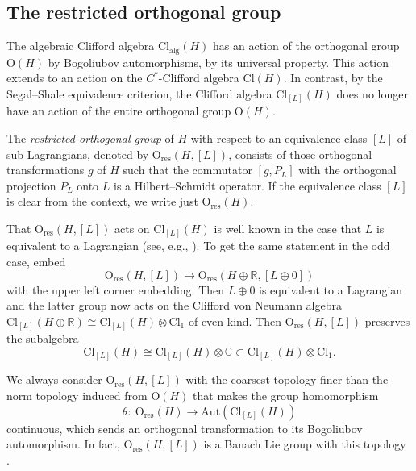 \documentclass[pdftex]{sigma}
\numberwithin{equation}{section}
\newcommand{\R}{\mathbb{R}}
\newcommand{\C}{\mathbb{C}}
\newcommand{\Cl}{\mathrm{Cl}}
\newcommand{\res}{\mathrm{res}}
\newcommand{\Aut}{\mathrm{Aut}}
\renewcommand{\O}{\mathrm{O}}
\begin{document}
\subsection{The restricted orthogonal group}

The algebraic Clifford algebra $\Cl_{\mathrm{alg}}(H)$ has an action of the orthogonal group $\O(H)$ by Bogoliubov automorphisms, by its universal property.
This action extends to an action on the $C^*$-Clifford algebra $\Cl(H)$.
In contrast, by the Segal--Shale equivalence criterion, the Clifford algebra $\Cl_{[L]}(H)$ does no longer have an action of the entire orthogonal group $\O(H)$.

\begin{Definition}
The \emph{restricted orthogonal group} of $H$ with respect to an equivalence class $[L]$ of sub-Lagrangians, denoted by $\O_{\res}(H, [L])$, consists of those orthogonal transformations $g$ of $H$ such that the commutator $[g, P_L]$ with the orthogonal projection $P_L$ onto $L$ is a Hilbert--Schmidt operator.
If the equivalence class $[L]$ is clear from the context, we write just $\O_{\res}(H)$.
\end{Definition}

That $\O_{\res}(H, [L])$ acts on $\Cl_{[L]}(H)$ is well known in the case that $L$ is equivalent to a Lagrangian (see, e.g., \cite[Section~6]{Araki1}).
To get the same statement in the odd case, embed
\begin{equation*}
\O_{\res}(H, [L]) \longrightarrow \O_{\res}(H \oplus \R, [L \oplus 0])
\end{equation*}
 with the upper left corner embedding.
 Then $L \oplus 0$ is equivalent to a Lagrangian and the latter group now acts on the Clifford von Neumann algebra $\Cl_{[L]}(H \oplus \R) \cong \Cl_{[L]}(H) \otimes \Cl_1$ of even kind.
 Then $\O_{\res}(H, [L])$ preserves the subalgebra
 \begin{equation*}
 \Cl_{[L]}(H) \cong \Cl_{[L]}(H) \otimes \C \subset \Cl_{[L]}(H)\otimes \Cl_1.
\end{equation*}

We always consider $\O_{\res}(H, [L])$ with the coarsest topology finer than the norm topology induced from $\O(H)$ that makes the group homomorphism
\begin{equation} \label{vonNeumannBogoliubovMap}
 \theta\colon\ \O_{\res}(H) \to \Aut(\Cl_{[L]}(H))
\end{equation}
continuous, which sends an orthogonal transformation to its Bogoliubov automorphism.
In fact, $\O_{\res}(H, [L])$ is a Banach Lie group with this topology \cite[Sections~6.2 and~2.4]{PressleySegal}.
\end{document}
